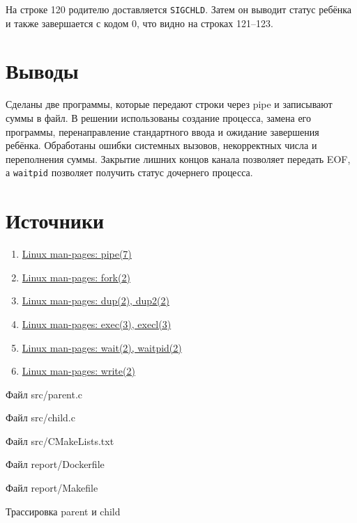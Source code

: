 \documentclass[12pt,a4paper]{article}
\begin{document}
На строке 120 родителю доставляется \texttt{SIGCHLD}. Затем он выводит статус ребёнка и также завершается с кодом 0, что видно на строках 121--123.

\section{Выводы}
Сделаны две программы, которые передают строки через pipe и записывают суммы в файл. В решении использованы создание процесса, замена его программы, перенаправление стандартного ввода и ожидание завершения ребёнка. Обработаны ошибки системных вызовов, некорректных числа и переполнения суммы. Закрытие лишних концов канала позволяет передать EOF, а \texttt{waitpid} позволяет получить статус дочернего процесса.

\section{Источники}
\begin{enumerate}
\item \href{https://man7.org/linux/man-pages/man7/pipe.7.html}{Linux man-pages: pipe(7)}
\item \href{https://man7.org/linux/man-pages/man2/fork.2.html}{Linux man-pages: fork(2)}
\item \href{https://man7.org/linux/man-pages/man2/dup.2.html}{Linux man-pages: dup(2), dup2(2)}
\item \href{https://man7.org/linux/man-pages/man3/exec.3.html}{Linux man-pages: exec(3), execl(3)}
\item \href{https://man7.org/linux/man-pages/man2/wait.2.html}{Linux man-pages: wait(2), waitpid(2)}
\item \href{https://man7.org/linux/man-pages/man2/write.2.html}{Linux man-pages: write(2)}
\end{enumerate}

\begin{listingblock}{Файл src/parent.c}
\end{listingblock}
\begin{listingblock}{Файл src/child.c}
\end{listingblock}
\begin{listingblock}{Файл src/CMakeLists.txt}
\end{listingblock}
\begin{listingblock}{Файл report/Dockerfile}
\end{listingblock}
\begin{listingblock}{Файл report/Makefile}
\end{listingblock}

\begin{listingblock}{Трассировка parent и child}
\end{listingblock}
\end{document}

